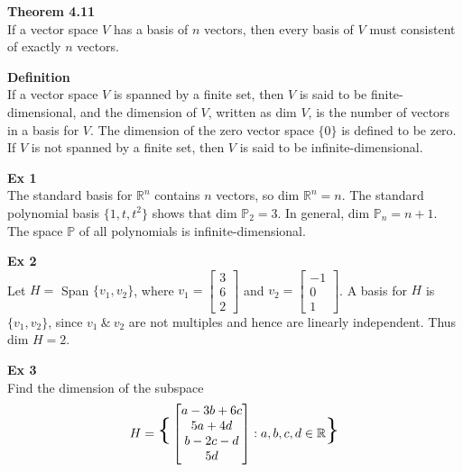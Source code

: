\documentclass{article}
\begin{document}
  \textbf{Theorem 4.11}\\
  If a vector space $ V $ has a basis of $ n $ vectors, then every basis of $ V $ must consistent of exactly $ n $ vectors. 
  
  \textbf{Definition}\\
  If a vector space $ V $ is spanned by a finite set, then $ V $ is said to be finite-dimensional, and the dimension of $ V $, written as dim $ V $, is the number of vectors in a basis for $ V $. The dimension of the zero vector space $ \{ 0 \} $ is defined to be zero. If $ V $ is not spanned by a finite set, then $ V $ is said to be infinite-dimensional.

  \textbf{Ex 1}\\
  The standard basis for $ \mathbb{R}^{n} $ contains $ n $ vectors, so dim $ \mathbb{R}^{n}=n $. The standard polynomial basis $ \{ 1,t,t^{2} \} $ shows that dim $ \mathbb{P}_2=3 $. In general, dim $ \mathbb{P}_n=n+1 $. The space $ \mathbb{P} $ of all polynomials is infinite-dimensional. 
 
  \textbf{Ex 2}\\
  Let $ H= $ Span $ \{ v_1,v_2 \} $, where $ v_1=\begin{bmatrix}
    3\\
    6\\
    2
  \end{bmatrix} $ and $ v_2=\begin{bmatrix}
    -1\\
    0\\
    1
  \end{bmatrix} $. A basis for $ H $ is $ \{ v_1,v_2 \} $, since $ v_1 ~\&~ v_2 $ are not multiples and hence are linearly independent. Thus dim $ H =2$. 

  \textbf{Ex 3}\\
  Find the dimension of the subspace
  \[
    H = \text{\huge{\{}} \begin{bmatrix}
      a-3b+6c\\
      5a+4d\\
      b-2c-d\\
      5d
    \end{bmatrix}: a,b,c,d \in \mathbb{R} \text{\huge{\}}}
  \]
\end{document}
